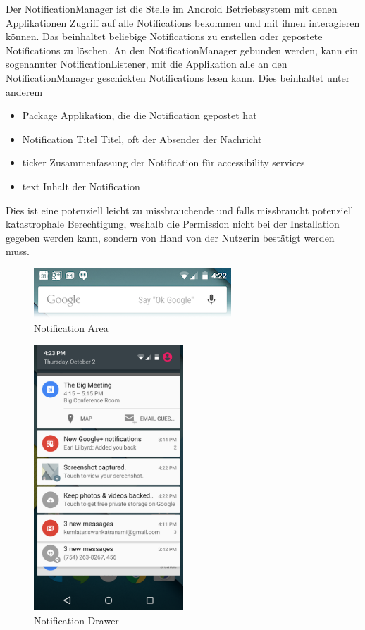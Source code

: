 Der NotificationManager ist die Stelle im Android Betriebssystem mit denen Applikationen Zugriff auf alle Notifications bekommen und mit ihnen interagieren können.
Das beinhaltet beliebige Notifications zu erstellen oder gepostete Notifications zu löschen.
An den NotificationManager gebunden werden, kann ein sogenannter NotificationListener, mit die Applikation alle an den NotificationManager geschickten Notifications lesen kann.
Dies beinhaltet unter anderem
\begin{itemize}
    \item {Package} Applikation, die die Notification gepostet hat
    \item {Notification Titel} Titel, oft der Absender der Nachricht
    \item {ticker} Zusammenfassung der Notification für accessibility services
    \item {text} Inhalt der Notification
\end{itemize}
Dies ist eine potenziell leicht zu missbrauchende und falls missbraucht potenziell katastrophale Berechtigung, weshalb die Permission nicht bei der Installation gegeben werden kann, sondern von Hand von der Nutzerin bestätigt werden muss. 

\begin{figure}[h]
    \centering
    \includegraphics{images/notification_area.png}
    \caption{Notification Area\cite{androidnotification}}
    \label{fig:notificationarea}
\end{figure}

\begin{figure}[h]
    \centering
    \includegraphics[width=0.5\textwidth]{images/notification_drawer.png}
    \caption{Notification Drawer\cite{androidnotification}}
    \label{fig:notificationdrawer}
\end{figure}




